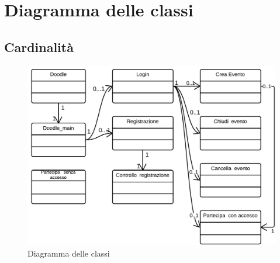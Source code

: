 \chapter{Diagramma delle classi}

\section{Cardinalità}
\begin{figure}[H]
\centering
\includegraphics[scale=0.30]{img/classi/classi.png}
\caption{Diagramma delle classi}
\label{fig:classicard}
\end{figure}

